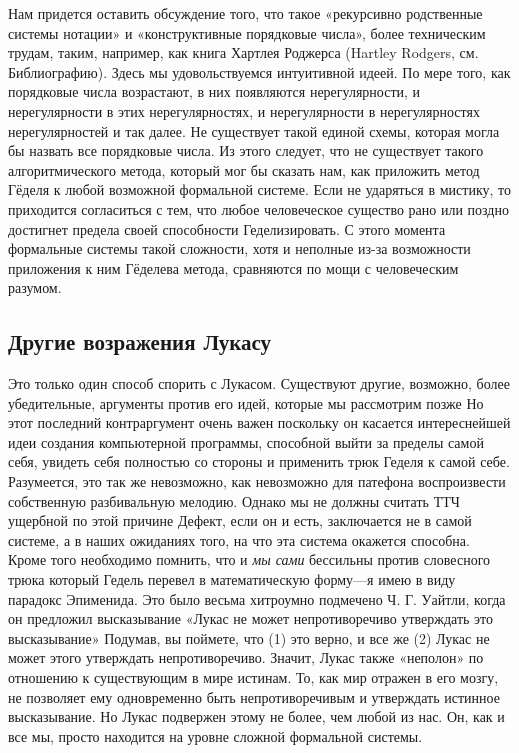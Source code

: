 \documentclass[../main.tex]{subfiles}
\begin{document}
Нам придется оставить обсуждение того, что такое «рекурсивно родственные системы нотации» и «конструктивные порядковые числа», более техническим трудам, таким, например, как книга Хартлея Роджерса (Hartley Rodgers, см. Библиографию). Здесь мы удовольствуемся интуитивной идеей. По мере того, как порядковые числа возрастают, в них появляются нерегулярности, и нерегулярности в этих нерегулярностях, и нерегулярности в нерегулярностях нерегулярностей и так далее. Не существует такой единой схемы, которая могла бы назвать все порядковые числа. Из этого следует, что не существует такого алгоритмического метода, который мог бы сказать нам, как приложить метод Гёделя к любой возможной формальной системе. Если не ударяться в мистику, то приходится согласиться с тем, что любое человеческое существо рано или поздно достигнет предела своей способности Геделизировать. С этого момента формальные системы такой сложности, хотя и неполные из-за возможности приложения к ним Гёделева метода, сравняются по мощи с человеческим разумом.


\subsection{Другие возражения Лукасу}

Это только один способ спорить с Лукасом. Существуют другие, возможно, более убедительные, аргументы против его идей, которые мы рассмотрим позже Но этот последний контраргумент очень важен поскольку он касается интереснейшей идеи создания компьютерной программы, способной выйти за пределы самой себя, увидеть себя полностью со стороны и применить трюк Геделя к самой себе. Разумеется, это так же невозможно, как невозможно для патефона воспроизвести собственную разбивальную мелодию. Однако мы не должны считать ТТЧ ущербной по этой причине Дефект, если он и есть, заключается не в самой системе, а в наших ожиданиях того, на что эта система окажется способна. Кроме того необходимо помнить, что и \emph{мы сами} бессильны против словесного трюка который Гедель перевел в математическую форму---я имею в виду парадокс Эпименида. Это было весьма хитроумно подмечено Ч. Г. Уайтли, когда он предложил высказывание «Лукас не может непротиворечиво утверждать это высказывание» Подумав, вы поймете, что (1) это верно, и все же (2) Лукас не может этого утверждать непротиворечиво. Значит, Лукас также «неполон» по отношению к существующим в мире истинам. То, как мир отражен в его мозгу, не позволяет ему одновременно быть непротиворечивым и утверждать истинное высказывание. Но Лукас подвержен этому не более, чем любой из нас. Он, как и все мы, просто находится на уровне сложной формальной системы.
\end{document}
